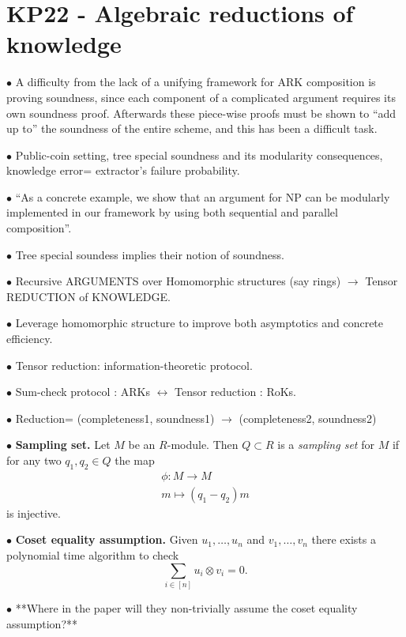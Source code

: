 


\section{KP22 - Algebraic reductions of knowledge}
$\bullet$ A difficulty from the lack of a unifying framework for ARK composition
is proving soundness, since each component of a complicated argument requires
its own soundness proof. Afterwards these piece-wise proofs must be shown
to ``add up to'' the soundness of the entire scheme, and this has been a
difficult task.

\medskip
$\bullet$ Public-coin setting, tree special soundness and its modularity consequences,
knowledge error= extractor's failure probability.

\medskip
$\bullet$ ``As a concrete example, we show that an argument for NP can be modularly
implemented in our framework by using both sequential and parallel composition''.

\medskip
$\bullet$ Tree special soundess implies their notion of soundness.

\medskip
$\bullet$ Recursive ARGUMENTS over Homomorphic structures (say rings) $\to$
Tensor REDUCTION of KNOWLEDGE.

\medskip
$\bullet$ Leverage homomorphic structure to improve both asymptotics and concrete
efficiency.

\medskip
$\bullet$ Tensor reduction: information-theoretic protocol.

\medskip
$\bullet$ Sum-check protocol : ARKs $\leftrightarrow$ Tensor reduction : RoKs.

\medskip
$\bullet$ Reduction= (completeness1, soundness1) $\to$ (completeness2, soundness2)

\medskip
$\bullet$ \textbf{Sampling set.}
Let $M$ be an $R$-module. Then $Q \subset R$ is a \emph{sampling set} for
$M$ if for any two $q_1, q_2 \in Q$ the map
\[
	\begin{array}{c}
		\phi: M \to M\\
		m \mapsto (q_1 - q_2)m
	\end{array}
\]
is injective.

\medskip
$\bullet$ \textbf{Coset equality assumption.} Given $u_1, \ldots, u_n$ and
$v_1, \ldots, v_n$ there exists a polynomial time algorithm to check
\[
	\sum_{i \in [n]} u_i\otimes v_i = 0.
\]

\medskip
$\bullet$ **Where in the paper will they non-trivially assume the coset equality
assumption?**


